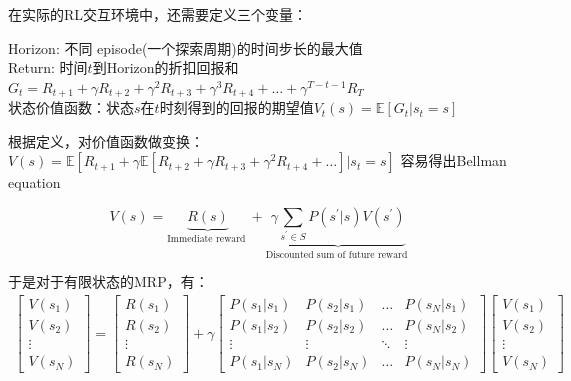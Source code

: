 \documentclass[UTF8]{ctexart}
\begin{document}
在实际的RL交互环境中，还需要定义三个变量：

\begin{adjustwidth}{1.3cm}{0cm}
    Horizon: 不同 episode(一个探索周期)的时间步长的最大值\\
    Return: 时间$t$到Horizon的折扣回报和$G_{t}=R_{t+1}+\gamma R_{t+2}+\gamma^{2} R_{t+3}+\gamma^{3} R_{t+4}+\ldots+\gamma^{T-t-1} R_{T} \label{gt}$\\
    状态价值函数：状态$s$在$t$时刻得到的回报的期望值$V_{t}(s)=\mathbb{E}\left[G_{t} | s_{t}=s\right]$
\end{adjustwidth}

根据定义，对价值函数做变换：$V(s)=\mathbb{E}\left[R_{t+1}+\gamma \mathbb{E}\left[R_{t+2}+\gamma R_{t+3}+
\gamma^{2} R_{t+4}+\ldots\right] | s_{t}=s\right]$
容易得出Bellman equation

\begin{equation}
    V(s)=\underbrace{R(s)}_{\text {Immediate reward }}+
    \underbrace{\gamma \sum_{s^{\prime} \in S} P\left(s^{\prime} | s\right) 
    V\left(s^{\prime}\right)}_{\text {Discounted sum of future reward }}
\end{equation}

于是对于有限状态的MRP，有：
$$\begin{array}{c}
    {\left[\begin{array}{c}
    V\left(s_{1}\right) \\
    V\left(s_{2}\right) \\
    \vdots \\
    V\left(s_{N}\right)
    \end{array}\right]=\left[\begin{array}{c}
    R\left(s_{1}\right) \\
    R\left(s_{2}\right) \\
    \vdots \\
    R\left(s_{N}\right)
    \end{array}\right]+\gamma\left[\begin{array}{cccc}
    P\left(s_{1} | s_{1}\right) & P\left(s_{2} | s_{1}\right) & \dots & P\left(s_{N} | s_{1}\right) \\
    P\left(s_{1} | s_{2}\right) & P\left(s_{2} | s_{2}\right) & \dots & P\left(s_{N} | s_{2}\right) \\
    \vdots & \vdots & \ddots & \vdots \\
    P\left(s_{1} | s_{N}\right) & P\left(s_{2} | s_{N}\right) & \dots & P\left(s_{N} | s_{N}\right)
    \end{array}\right]\left[\begin{array}{c}
    V\left(s_{1}\right) \\
    V\left(s_{2}\right) \\
    \vdots \\
    V\left(s_{N}\right)
    \end{array}\right]}
    \end{array}$$
\end{document}
